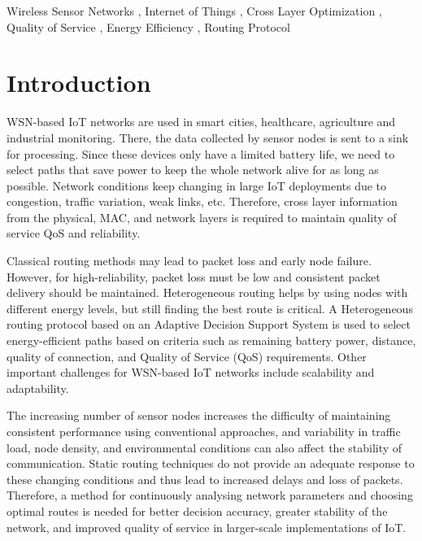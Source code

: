 \documentclass[a4paper,fleqn]{cas-dc}
\numberwithin{equation}{section}
\begin{document}
\begin{keywords}
Wireless Sensor Networks \sep 
Internet of Things \sep 
Cross Layer Optimization \sep 
Quality of Service \sep
Energy Efficiency \sep 
Routing Protocol
\end{keywords}

\maketitle



\section{Introduction}
WSN-based IoT networks are used in smart cities, healthcare, agriculture and industrial monitoring. There, the data collected by sensor nodes is sent to a sink for processing. Since these devices only have a limited battery life, we need to select paths that save power to keep the whole network alive for as long as possible. Network conditions keep changing in large IoT deployments due to congestion, traffic variation, weak links, etc. Therefore, cross layer information from the physical, MAC, and network layers is required to maintain quality of service QoS and reliability. 

Classical routing methods may lead to packet loss and early node failure. However, for high-reliability, packet loss must be low and consistent packet delivery should be maintained. Heterogeneous routing helps by using nodes with different energy levels, but still finding the best route is critical. A Heterogeneous routing protocol based on an Adaptive Decision Support System is used to select energy-efficient paths based on criteria such as remaining battery power, distance, quality of connection, and Quality of Service (QoS) requirements. Other important challenges for WSN-based IoT networks include scalability and adaptability.

The increasing number of sensor nodes increases the difficulty of maintaining consistent performance using conventional approaches, and variability in traffic load, node density, and environmental conditions can also affect the stability of communication. Static routing techniques do not provide an adequate response to these changing conditions and thus lead to increased delays and loss of packets. Therefore, a method for continuously analysing network parameters and choosing optimal routes is needed for better decision accuracy, greater stability of the network, and improved quality of service in larger-scale implementations of IoT.
\end{document}
